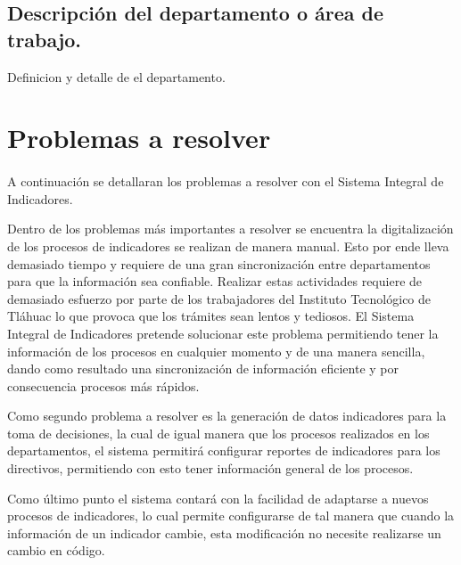 \subsection{Descripci\'on del departamento o \'area de trabajo.}
Definicion y detalle de el departamento.

\section{Problemas a resolver}
\paragraph{}%

A continuaci\'on se detallaran los problemas a resolver con el Sistema Integral de Indicadores.

Dentro de los problemas m\'as importantes a resolver se encuentra la digitalizaci\'on de los procesos de indicadores se realizan de manera manual. Esto por ende lleva demasiado tiempo y requiere de una gran sincronizaci\'on entre departamentos para que la informaci\'on sea confiable. Realizar estas actividades requiere de demasiado esfuerzo por parte de los trabajadores del Instituto Tecnol\'ogico de Tl\'ahuac lo que provoca que los tr\'amites sean lentos y tediosos. El Sistema Integral de Indicadores pretende solucionar este problema permitiendo tener la informaci\'on de los procesos en cualquier momento y de una manera sencilla, dando como resultado una sincronizaci\'on de informaci\'on eficiente y por consecuencia procesos m\'as r\'apidos.

Como segundo problema a resolver es la generaci\'on de datos indicadores para la toma de decisiones, la cual de igual manera que los procesos realizados en los departamentos, el sistema permitir\'a configurar reportes de indicadores para los directivos, permitiendo con esto tener informaci\'on general de los procesos.

Como \'ultimo punto el sistema contar\'a con la facilidad de adaptarse a nuevos procesos de indicadores, lo cual permite configurarse de tal manera que cuando la informaci\'on de un indicador cambie, esta modificaci\'on no necesite realizarse un cambio en c\'odigo.
